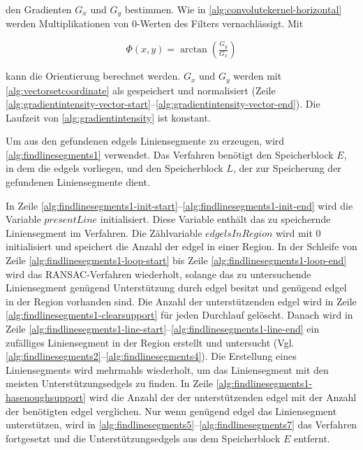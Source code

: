 den Gradienten $G_x$ und $G_y$ bestimmen. Wie in \autoref{alg:convolutekernel-horizontal} werden Multiplikationen von
 $0$-Werten des Filters vernachlässigt. Mit

\begin{equation}
	\label{eq:orientation}
	\Phi(x,y) = \arctan{\left(\tfrac{G_y}{G_x}\right)}
\end{equation}

kann die Orientierung berechnet werden. $G_x$ und $G_y$ werden mit \autoref{alg:vectorsetcoordinate} als
  gespeichert und normalisiert
 (Zeile \ref{alg:gradientintensity-vector-start}--\ref{alg:gradientintensity-vector-end}). Die Laufzeit von
 \autoref{alg:gradientintensity} ist konstant.

Um aus den gefundenen \glspl{edgel} Liniensegmente zu erzeugen, wird \autoref{alg:findlinesegments1} verwendet. Das
 Verfahren benötigt den Speicherblock $E$, in dem die \glspl{edgel} vorliegen, und den Speicherblock $L$, der zur
 Speicherung der gefundenen Liniensegmente dient.



In Zeile \ref{alg:findlinesegments1-init-start}--\ref{alg:findlinesegments1-init-end} wird die Variable
 $\mathit{presentLine}$ initialisiert. Diese Variable enthält das zu speichernde Liniensegment im Verfahren.
 Die Zählvariable $\mathit{edgelsInRegion}$ wird mit $0$ initialisiert und speichert die Anzahl der \gls{edgel} in
 einer Region. In der Schleife von Zeile \ref{alg:findlinesegments1-loop-start} bis Zeile
 \ref{alg:findlinesegments1-loop-end} wird das RANSAC-Verfahren wiederholt, solange das zu untersuchende Liniensegment
 genügend Unterstützung durch \gls{edgel} besitzt und genügend \gls{edgel} in der Region vorhanden sind. Die Anzahl der
 unterstützenden \gls{edgel} wird in Zeile \ref{alg:findlinesegments1-clearsupport} für jeden Durchlauf gelöscht.
 Danach wird in Zeile \ref{alg:findlinesegments1-line-start}--\ref{alg:findlinesegments1-line-end} ein zufälliges
 Liniensegment in der Region erstellt und untersucht
 (Vgl. \autoref{alg:findlinesegments2}--\autoref{alg:findlinesegments4}). Die Erstellung eines Liniensegments wird
 mehrmahls wiederholt, um das Liniensegment mit den meisten Unterstützungsedgels zu finden. In Zeile
 \ref{alg:findlinesegments1-hasenoughsupport} wird die Anzahl der der unterstützenden \gls{edgel} mit der Anzahl der
 benötigten \gls{edgel} verglichen. Nur wenn genügend \gls{edgel} das Liniensegment unterstützen, wird in
 \autoref{alg:findlinesegments5}--\autoref{alg:findlinesegments7} das Verfahren fortgesetzt und die
 Unterstützungsedgels aus dem Speicherblock $E$ entfernt.

